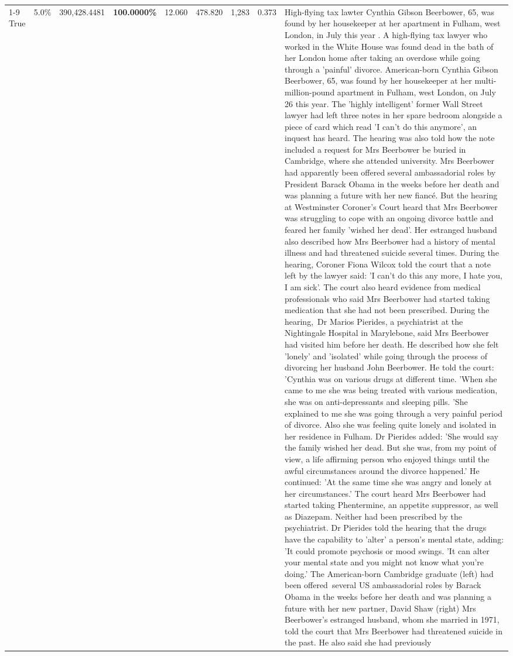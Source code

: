 \begin{table}[H]
\begin{tabular}{lllrlllll}
\cline{1-9}
True & 5.0\% & 390,428.4481 & \bfseries \color{red} 100.0000\% & 12.060 & 478.820 & 1,283 & 0.373 & High-flying tax lawter Cynthia Gibson Beerbower, 65, was found by her housekeeper at her apartment in Fulham, west London, in July this year . A high-flying tax lawyer who worked in the White House was found dead in the bath of her London home after taking an overdose while going through a 'painful' divorce. American-born Cynthia Gibson Beerbower, 65, was found by her housekeeper at her multi-million-pound apartment in Fulham, west London, on July 26 this year. The 'highly intelligent' former Wall Street lawyer had left three notes in her spare bedroom alongside a piece of card which read 'I can't do this anymore', an inquest has heard. The hearing was also told how the note included a request for Mrs Beerbower be buried in Cambridge, where she attended university. Mrs Beerbower had apparently been offered several ambassadorial roles by President Barack Obama in the weeks before her death and was planning a future with her new fiancé. But the hearing at Westminster Coroner's Court heard that Mrs Beerbower was struggling to cope with an ongoing divorce battle and feared her family 'wished her dead'. Her estranged husband also described how Mrs Beerbower had a history of mental illness and had threatened suicide several times. During the hearing, Coroner Fiona Wilcox told the court that a note left by the lawyer said: 'I can't do this any more, I hate you, I am sick'. The court also heard evidence from medical professionals who said Mrs Beerbower had started taking medication that she had not been prescribed. During the hearing, Dr Marios Pierides, a psychiatrist at the Nightingale Hospital in Marylebone, said Mrs Beerbower had visited him before her death. He described how she felt 'lonely' and 'isolated' while going through the process of divorcing her husband John Beerbower. He told the court: 'Cynthia was on various drugs at different time. 'When she came to me she was being treated with various medication, she was on anti-depressants and sleeping pills. 'She explained to me she was going through a very painful period of divorce. Also she was feeling quite lonely and isolated in her residence in Fulham. Dr Pierides added: 'She would say the family wished her dead. But she was, from my point of view, a life affirming person who enjoyed things until the awful circumstances around the divorce happened.' He continued: 'At the same time she was angry and lonely at her circumstances.' The court heard Mrs Beerbower had started taking Phentermine, an appetite suppressor, as well as Diazepam. Neither had been prescribed by the psychiatrist. Dr Pierides told the hearing that the drugs have the capability to 'alter' a person's mental state, adding: 'It could promote psychosis or mood swings. 'It can alter your mental state and you might not know what you're doing.' The American-born Cambridge graduate (left) had been offered several US ambassadorial roles by Barack Obama in the weeks before her death and was planning a future with her new partner, David Shaw (right) Mrs Beerbower's estranged husband, whom she married in 1971, told the court that Mrs Beerbower had threatened suicide in the past. He also said she had previously 
\end{tabular}
\end{table}
